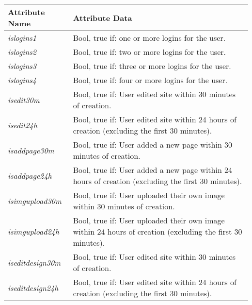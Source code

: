 \begin{table}[H]
	\centering
	\begin{tabularx}{\textwidth}{l|X}
		\textbf{Attribute Name} & \textbf{Attribute Data}                                                                                                     \\ \hline
		\textit{islogins1}                       & Bool, true if: one or more logins for the user.                                                            \\
		\textit{islogins2}                       & Bool, true if: two or more logins for the user.                                                            \\
		\textit{islogins3}                       & Bool, true if: three or more logins for the user.                                                          \\
		\textit{islogins4}                       & Bool, true if: four or more logins for the user.                                                           \\
		\textit{isedit30m}                       & Bool, true if: User edited site within 30 minutes of creation.                                             \\
		\textit{isedit24h}                       & Bool, true if: User edited site within 24 hours of creation (excluding the first 30 minutes).              \\
		\textit{isaddpage30m}                    & Bool, true if: User added a new page within 30 minutes of creation.                                        \\
		\textit{isaddpage24h}                    & Bool, true if: User added a new page within 24 hours of creation (excluding the first 30 minutes).         \\
		\textit{isimgupload30m}                  & Bool, true if: User uploaded their own image within 30 minutes of creation.                                \\
		\textit{isimgupload24h}                  & Bool, true if: User uploaded their own image within 24 hours of creation (excluding the first 30 minutes). \\
		\textit{iseditdesign30m}                 & Bool, true if: User edited site within 30 minutes of creation.                                             \\
		\textit{iseditdesign24h}                 & Bool, true if: User edited site within 24 hours of creation (excluding the first 30 minutes).              \\

\end{tabularx}
\end{table}
